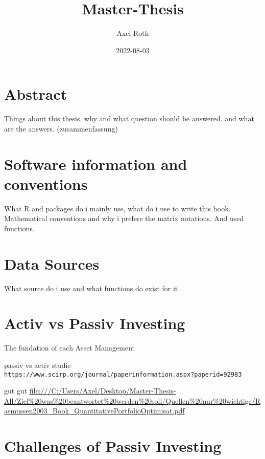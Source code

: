 \documentclass[
  oneside]{book}
\title{Master-Thesis}
\author{Axel Roth}
\date{2022-08-03}
\begin{document}
\maketitle

{
\setcounter{tocdepth}{1}
\tableofcontents
}
\hypertarget{abstract}{%
\chapter{Abstract}\label{abstract}}

Things about this thesis. why and what question should be answered. and what are the answers. (zusammenfassung)

\hypertarget{software-information-and-conventions}{%
\chapter{Software information and conventions}\label{software-information-and-conventions}}

What R and packages do i mainly use, what do i use to write this book. Mathematical conventions and why i prefere the matrix notations. And used functions.

\hypertarget{data-sources}{%
\chapter{Data Sources}\label{data-sources}}

What source do i use and what functions do exist for it

\hypertarget{activ-vs-passiv-investing}{%
\chapter{Activ vs Passiv Investing}\label{activ-vs-passiv-investing}}

The fundation of each Asset Management

passiv vs activ studie
\texttt{https://www.scirp.org/journal/paperinformation.aspx?paperid=92983}

gut gut
\url{file:///C:/Users/Axel/Desktop/Master-Thesis-All/Ziel\%20was\%20beantwortet\%20werden\%20soll/Quellen\%20nur\%20wichtige/Rasmussen2003_Book_QuantitativePortfolioOptimisat.pdf}

\hypertarget{challenges-of-passiv-investing}{%
\chapter{Challenges of Passiv Investing}\label{challenges-of-passiv-investing}}
\end{document}

